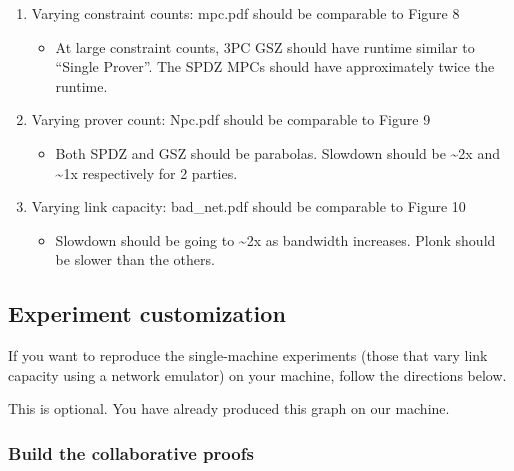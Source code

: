 \documentclass[letterpaper,twocolumn,10pt]{article}
\providecommand{\tightlist}{%
  \setlength{\itemsep}{0pt}\setlength{\parskip}{0pt}}
\begin{document}
{\begin{enumerate}
  \begin{enumerate}
  \def\labelenumii{\arabic{enumii}.}
  \tightlist
  \item
    Varying constraint counts: mpc.pdf should be comparable to Figure 8

    \begin{itemize}
    \tightlist
    \item
      At large constraint counts, 3PC GSZ should have runtime similar to
      ``Single Prover''. The SPDZ MPCs should have approximately twice
      the runtime.
    \end{itemize}
  \item
    Varying prover count: Npc.pdf should be comparable to Figure 9

    \begin{itemize}
    \tightlist
    \item
      Both SPDZ and GSZ should be parabolas. Slowdown should be
      \textasciitilde2x and \textasciitilde1x respectively for 2
      parties.
    \end{itemize}
  \item
    Varying link capacity: bad\_net.pdf should be comparable to Figure
    10

    \begin{itemize}
    \tightlist
    \item
      Slowdown should be going to \textasciitilde2x as bandwidth
      increases. Plonk should be slower than the others.
    \end{itemize}
  \end{enumerate}
\end{enumerate}

\subsection{Experiment customization}

If you want to reproduce the single-machine experiments (those that vary link
capacity using a network emulator) on your machine, follow the directions below.

This is optional. You have already produced this graph on our machine.

\hypertarget{build-the-collaborative-proofs-1}{%
\subsubsection{Build the collaborative
proofs}\label{build-the-collaborative-proofs-1}}

}
\end{document}
